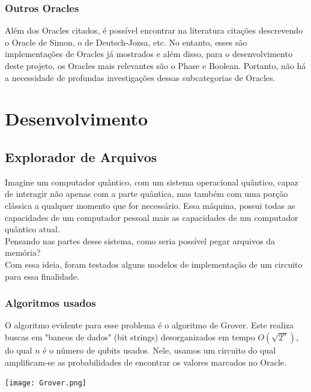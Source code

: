 \documentclass{article}
\makeatletter
\renewcommand\subsubsubsection{\@startsection{paragraph}{4}{\z@}{-2.5ex\@plus -1ex \@minus -.25ex}{1.25ex \@plus .25ex}{\normalfont\normalsize\bfseries}}
\makeatother
\begin{document}
\subsubsection{Outros Oracles}
Além dos Oracles citados, é possível encontrar na literatura citações descrevendo o Oracle de Simon, o de Deutsch-Jozsa, etc. No entanto, esses são implementações de Oracles já mostrados e além disso, para o desenvolvimento deste projeto, os Oracles mais relevantes são o Phase e Boolean. Portanto, não há a necessidade de profundas investigações dessas subcategorias de Oracles.


\section{Desenvolvimento}

\subsection{Explorador de Arquivos} \label{file-explorer}

Imagine um computador quântico, com um sistema operacional quântico, capaz de interagir não apenas com a parte quântica, mas também com uma porção clássica a qualquer momento que for necessário. Essa máquina, possui todas as capacidades de um computador pessoal mais as capacidades de um computador quântico atual.\\
Pensando nas partes desse sistema, como seria possível pegar arquivos da memória?\\
Com essa ideia, foram testados alguns modelos de implementação de um circuito para essa finalidade.

\subsubsection{Algoritmos usados}

\subsubsubsection{Grover}
O algoritmo evidente para esse problema é o algoritmo de Grover. Este realiza buscas em "bancos de dados" (bit strings) desorganizados em tempo $O(\sqrt{2^n})$, do qual $n$ é o número de qubits usados. Nele, usamos um circuito do qual amplificam-se as probabilidades de encontrar os valores marcados no Oracle.

\begin{center}
	\texttt{[image: Grover.png]}
	\label{fig:grover-default-circuit}
\end{center}
\end{document}
